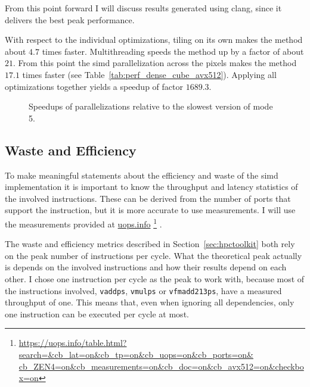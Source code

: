 \documentclass[a4paper, 11pt]{memoir}
\begin{document}
    From this point forward I will discuss results generated using clang, since it delivers the best peak performance.
    
    With respect to the individual optimizations, tiling on its own makes the method about $4.7$ times faster. Multithreading
    speeds the method up by a factor of about $21$. From this point the \gls{simd} parallelization across the pixels makes
    the method $17.1$ times faster (see Table~\ref{tab:perf_dense_cube_avx512}). Applying all optimizations together
    yields a speedup of factor $1689.3$.
    \begin{figure}[t]
        \centering
        
        \caption{Speedups of parallelizations relative to the slowest version of mode 5.}
        \label{fig:speedups}
    \end{figure}

    \subsection{Waste and Efficiency}
    \label{sec:res_waste}
    To make meaningful statements about the efficiency and waste of the \gls{simd} implementation it is important to know
    the \gls{throughput} and \gls{latency} statistics of the involved instructions. These can be derived from the number
    of ports that support the instruction, but it is more accurate to use measurements. I will use the measurements
    provided at \href{https://uops.info/table.html?search=&cb_lat=on&cb_tp=on&cb_uops=on&cb_ports=on&cb_ZEN4=on&cb_measurements=on&cb_doc=on&cb_avx512=on&checkbox=on}{uops.info}
    \footnote{\href{https://uops.info/table.html?search=&cb_lat=on&cb_tp=on&cb_uops=on&cb_ports=on&cb_ZEN4=on&cb_measurements=on&cb_doc=on&cb_avx512=on&checkbox=on}{https://uops.info/table.html?search=\&cb\_lat=on\&cb\_tp=on\&cb\_uops=on\&cb\_ports=on\&\\cb\_ZEN4=on\&cb\_measurements=on\&cb\_doc=on\&cb\_avx512=on\&checkbox=on}}
    \cite{Abel19a}.

    The waste and efficiency metrics described in Section~\ref{sec:hpctoolkit} both rely on the peak number of instructions
    per cycle. What the theoretical peak actually is depends on the involved instructions and how their results depend
    on each other. I chose one instruction per cycle as the peak to work with, because most of the instructions
    involved, \eg \texttt{vaddps}, \texttt{vmulps} or \texttt{vfmadd213ps}, have a measured
    \gls{throughput} of one. This means that, even when ignoring all dependencies, only one instruction can be executed
    per cycle at most.
\end{document}
